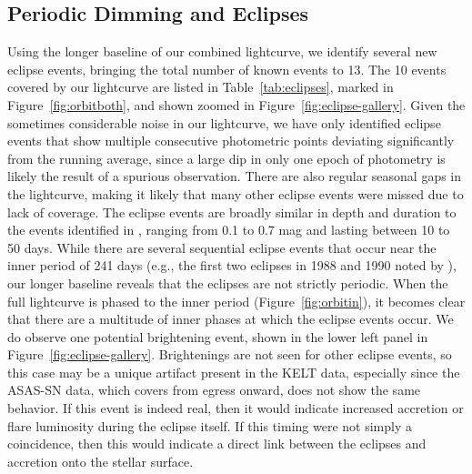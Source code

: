 \documentclass[twocolumn]{aastex61}
\begin{document}
\subsection{Periodic Dimming and Eclipses}
\label{sec:eclipses}
Using the longer baseline of our combined lightcurve, we identify several new eclipse events, bringing the total number of known events to 13. The 10 events covered by our lightcurve are listed in Table~\ref{tab:eclipses}, marked in Figure~\ref{fig:orbitboth}, and shown zoomed in Figure~\ref{fig:eclipse-gallery}. Given the sometimes considerable noise in our lightcurve, we have only identified eclipse events that show multiple consecutive photometric points deviating significantly from the running average, since a large dip in only one epoch of photometry is likely the result of a spurious observation. There are also regular seasonal gaps in the lightcurve, making it likely that many other eclipse events were missed due to lack of coverage.
The eclipse events are broadly similar in depth and duration to the events identified in \citet{shevchenko92,shevchenko98}, ranging from 0.1 to 0.7 mag and lasting between 10 to 50 days. While there are several sequential eclipse events that occur near the inner period of 241 days (e.g., the first two eclipses in 1988 and 1990 noted by \citet{shevchenko92}), our longer baseline reveals that the eclipses are not strictly periodic.
When the full lightcurve is phased to the inner period (Figure~\ref{fig:orbitin}), it becomes clear that there are a multitude of inner phases at which the eclipse events occur.
We do observe one potential brightening event, shown in the lower left panel in Figure~\ref{fig:eclipse-gallery}. Brightenings are not seen for other eclipse events, so this case may be a unique artifact present in the KELT data, especially since the ASAS-SN data, which covers from egress onward, does not show the same behavior. If this event is indeed real, then it would indicate increased accretion or flare luminosity during the eclipse itself. If this timing were not simply a coincidence, then this would indicate a direct link between the eclipses and accretion onto the stellar surface.
\end{document}
